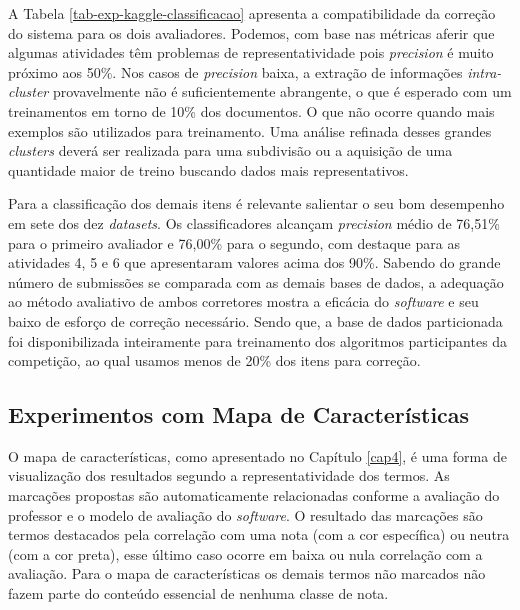 A Tabela \ref{tab-exp-kaggle-classificacao} apresenta a compatibilidade da correção do sistema para os dois avaliadores. Podemos, com base nas métricas aferir que algumas atividades têm problemas de representatividade pois \textit{precision} é muito próximo aos 50\%. Nos casos de \textit{precision} baixa, a extração de informações \textit{intra-cluster} provavelmente não é suficientemente abrangente, o que é esperado com um treinamentos em torno de 10\% dos documentos. O que não ocorre quando mais exemplos são utilizados para treinamento. Uma análise refinada desses grandes \textit{clusters} deverá ser realizada para uma subdivisão ou a aquisição de uma quantidade maior de treino buscando dados mais representativos. 

Para a classificação dos demais itens é relevante salientar o seu bom desempenho em sete dos dez \textit{datasets}. Os classificadores alcançam \textit{precision} médio de 76,51\% para o primeiro avaliador e 76,00\% para o segundo, com destaque para as atividades 4, 5 e 6 que apresentaram valores acima dos 90\%. Sabendo do grande número de submissões se comparada com as demais bases de dados, a adequação ao método avaliativo de ambos corretores mostra a eficácia do \textit{software} e seu baixo de esforço de correção necessário. Sendo que, a base de dados particionada foi disponibilizada inteiramente para treinamento dos algoritmos participantes da competição, ao qual usamos menos de 20\% dos itens para correção.

\subsection{Experimentos com Mapa de Características} \label{exp-mapas}
O mapa de características, como apresentado no Capítulo \ref{cap4}, é uma forma de visualização dos resultados segundo a representatividade dos termos. As marcações propostas são automaticamente relacionadas conforme a avaliação do professor e o modelo de avaliação do \textit{software}. O resultado das marcações são termos destacados pela correlação com uma nota (com a cor específica) ou neutra (com a cor preta), esse último caso ocorre em baixa ou nula correlação com a avaliação. Para o mapa de características os demais termos não marcados não fazem parte do conteúdo essencial de nenhuma classe de nota.

